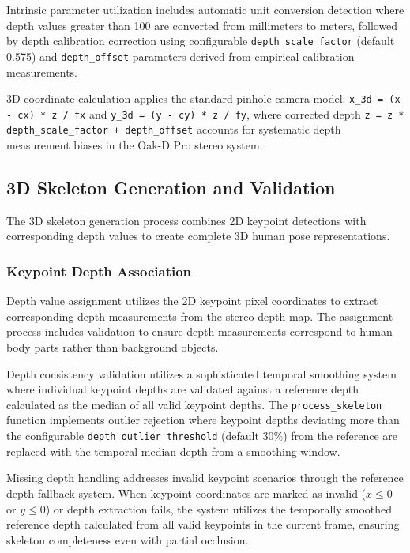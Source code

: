 Intrinsic parameter utilization includes automatic unit conversion detection where depth values greater than 100 are converted from millimeters to meters, followed by depth calibration correction using configurable \texttt{depth\_scale\_factor} (default 0.575) and \texttt{depth\_offset} parameters derived from empirical calibration measurements.

3D coordinate calculation applies the standard pinhole camera model: \texttt{x\_3d = (x - cx) * z / fx} and \texttt{y\_3d = (y - cy) * z / fy}, where corrected depth \texttt{z = z * depth\_scale\_factor + depth\_offset} accounts for systematic depth measurement biases in the Oak-D Pro stereo system.

\subsection{3D Skeleton Generation and Validation}

The 3D skeleton generation process combines 2D keypoint detections with corresponding depth values to create complete 3D human pose representations.

\subsubsection{Keypoint Depth Association}

Depth value assignment utilizes the 2D keypoint pixel coordinates to extract corresponding depth measurements from the stereo depth map. The assignment process includes validation to ensure depth measurements correspond to human body parts rather than background objects.

Depth consistency validation utilizes a sophisticated temporal smoothing system where individual keypoint depths are validated against a reference depth calculated as the median of all valid keypoint depths. The \texttt{process\_skeleton} function implements outlier rejection where keypoint depths deviating more than the configurable \texttt{depth\_outlier\_threshold} (default 30\%) from the reference are replaced with the temporal median depth from a smoothing window.

Missing depth handling addresses invalid keypoint scenarios through the reference depth fallback system. When keypoint coordinates are marked as invalid ($x \leq 0$ or $y \leq 0$) or depth extraction fails, the system utilizes the temporally smoothed reference depth calculated from all valid keypoints in the current frame, ensuring skeleton completeness even with partial occlusion.

